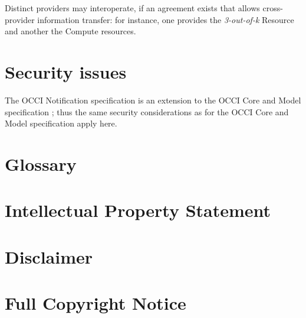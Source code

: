 \documentclass[10pt,a4paper]{article}
\begin{document}
Distinct providers may interoperate, if an agreement exists that allows cross-provider information transfer: for instance, one provides the  {\em 3-out-of-k} Resource and another the Compute resources.

\section{Security issues}
The OCCI Notification specification is an extension to the OCCI Core
and Model specification \cite{occi:core}; thus the same security
considerations as for the OCCI Core and Model specification apply
here.

\section{Glossary}
\label{sec:glossary}

 
%

\section{Intellectual Property Statement}


\section{Disclaimer}


\section{Full Copyright Notice}




\end{document}
